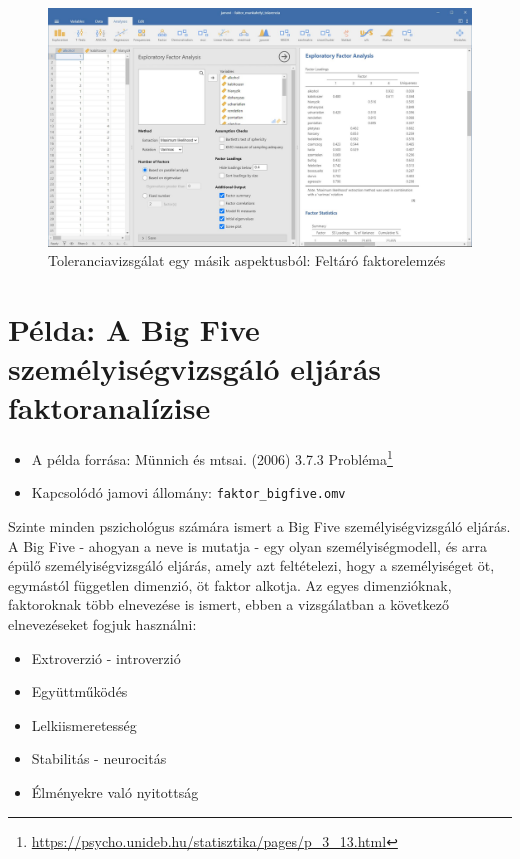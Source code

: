 \documentclass[
  letterpaper,
]{krantz}
\providecommand{\tightlist}{%
  \setlength{\itemsep}{0pt}\setlength{\parskip}{0pt}}\usepackage{longtable,booktabs,array}
\renewcommand{\href}[2]{#2\footnote{\url{#1}}}
\begin{document}
\begin{figure}

{\centering \includegraphics{./images/faktor_munkahelyi_tolarencia_kep_01.jpg}

}

\caption{Toleranciavizsgálat egy másik aspektusból: Feltáró
faktorelemzés}

\end{figure}

\hypertarget{puxe9lda-a-big-five-szemuxe9lyisuxe9gvizsguxe1luxf3-eljuxe1ruxe1s-faktoranaluxedzise}{%
\section{Példa: A Big Five személyiségvizsgáló eljárás
faktoranalízise}\label{puxe9lda-a-big-five-szemuxe9lyisuxe9gvizsguxe1luxf3-eljuxe1ruxe1s-faktoranaluxedzise}}

\begin{itemize}
\tightlist
\item
  A példa forrása: Münnich és mtsai. (2006)
  \href{https://psycho.unideb.hu/statisztika/pages/p_3_13.html}{3.7.3
  Probléma}
\item
  Kapcsolódó jamovi állomány: \texttt{faktor\_bigfive.omv}
\end{itemize}

Szinte minden pszichológus számára ismert a Big Five személyiségvizsgáló
eljárás. A Big Five - ahogyan a neve is mutatja - egy olyan
személyiségmodell, és arra épülő személyiségvizsgáló eljárás, amely azt
feltételezi, hogy a személyiséget öt, egymástól független dimenzió, öt
faktor alkotja. Az egyes dimenzióknak, faktoroknak több elnevezése is
ismert, ebben a vizsgálatban a következő elnevezéseket fogjuk használni:

\begin{itemize}
\tightlist
\item
  Extroverzió - introverzió
\item
  Együttműködés
\item
  Lelkiismeretesség
\item
  Stabilitás - neurocitás
\item
  Élményekre való nyitottság
\end{itemize}
\end{document}
